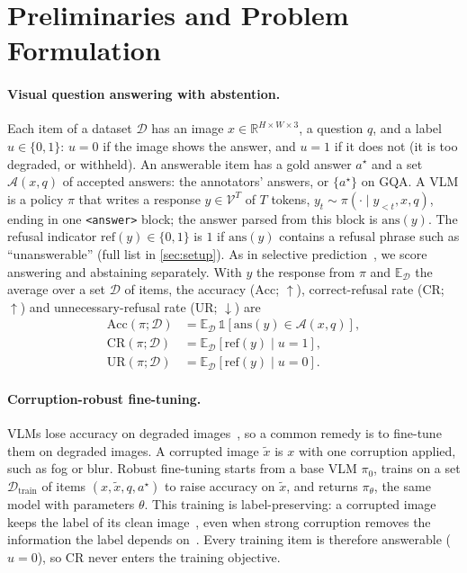\section{Preliminaries and Problem Formulation}
\label{sec:problem}

\paragraph{Visual question answering with abstention.}
Each item of a dataset $\mathcal{D}$ has an image $x \in \mathbb{R}^{H \times W \times 3}$, a question $q$, and a label $u \in \{0, 1\}$: $u = 0$ if the image shows the answer, and $u = 1$ if it does not (it is too degraded, or withheld). An answerable item has a gold
answer $a^\star$ and a set $\mathcal{A}(x, q)$ of accepted answers: the annotators'
answers, or $\{a^\star\}$ on GQA. A VLM is a policy $\pi$ that writes a response
$y \in \mathcal{V}^T$ of $T$ tokens, $y_t \sim \pi(\cdot \mid y_{<t}, x, q)$, ending in one
\texttt{<answer>} block; the answer parsed from this block is $\mathrm{ans}(y)$. The refusal
indicator $\mathrm{ref}(y) \in \{0, 1\}$ is $1$ if $\mathrm{ans}(y)$ contains a refusal
phrase such as ``unanswerable'' (full list in \cref{sec:setup}). As in selective
prediction~\cite{geifman2017selective}, we score answering and abstaining separately. With
$y$ the response from $\pi$ and $\mathbb{E}_{\mathcal{D}}$ the average over a set
$\mathcal{D}$ of items, the accuracy ($\mathrm{Acc}$; $\uparrow$), correct-refusal rate
($\mathrm{CR}$; $\uparrow$) and unnecessary-refusal rate ($\mathrm{UR}$; $\downarrow$) are
\begin{align}
\mathrm{Acc}(\pi;\mathcal{D}) &= \mathbb{E}_{\mathcal{D}}\,
  \mathds{1}\!\left[\mathrm{ans}(y) \in \mathcal{A}(x,q)\right], \label{eq:acc}\\
\mathrm{CR}(\pi;\mathcal{D}) &= \mathbb{E}_{\mathcal{D}}\!\left[\mathrm{ref}(y) \mid u = 1\right],
  \label{eq:cr}\\
\mathrm{UR}(\pi;\mathcal{D}) &= \mathbb{E}_{\mathcal{D}}\!\left[\mathrm{ref}(y) \mid u = 0\right].
  \label{eq:ur}
\end{align}

\paragraph{Corruption-robust fine-tuning.}
VLMs lose accuracy on degraded images~\cite{usama2025analysing}, so a common remedy is to fine-tune them on degraded images. A corrupted image $\tilde{x}$ is $x$ with one corruption applied, such as fog or blur. Robust fine-tuning starts from a base VLM $\pi_0$, trains on a set $\mathcal{D}_{\mathrm{train}}$ of items $(x, \tilde{x}, q, a^\star)$ to raise accuracy on $\tilde{x}$, and returns $\pi_\theta$, the same model with parameters $\theta$. This training is label-preserving: a corrupted image keeps the label of its clean image~\cite{hendrycks2020augmix,liu2023softaug,he2026videoreasoningmodelsready}, even when strong corruption removes the information the label depends on~\cite{liu2023softaug}. Every training item is therefore answerable ($u = 0$), so $\mathrm{CR}$ never enters the training objective.

